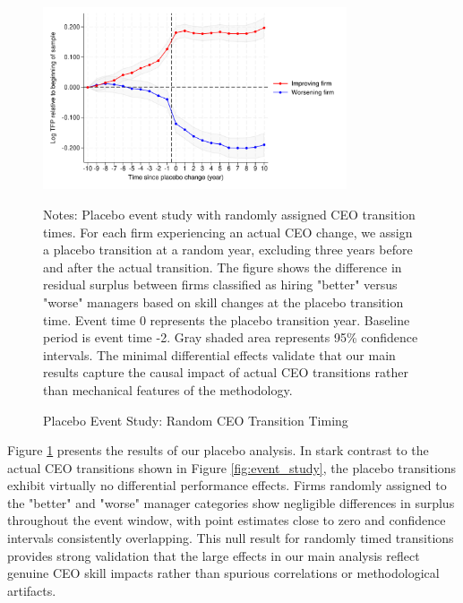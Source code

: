 \documentclass[11pt,a4paper]{article}
\begin{document}
\begin{figure}[htbp]
\centering
\includegraphics[width=0.8\textwidth]{figure/placebo.pdf}
\caption{Placebo Event Study: Random CEO Transition Timing}
\label{fig:placebo}
\footnotesize
Notes: Placebo event study with randomly assigned CEO transition times. For each firm experiencing an actual CEO change, we assign a placebo transition at a random year, excluding three years before and after the actual transition. The figure shows the difference in residual surplus between firms classified as hiring "better" versus "worse" managers based on skill changes at the placebo transition time. Event time 0 represents the placebo transition year. Baseline period is event time -2. Gray shaded area represents 95\% confidence intervals. The minimal differential effects validate that our main results capture the causal impact of actual CEO transitions rather than mechanical features of the methodology.
\end{figure}

Figure \ref{fig:placebo} presents the results of our placebo analysis. In stark contrast to the actual CEO transitions shown in Figure \ref{fig:event_study}, the placebo transitions exhibit virtually no differential performance effects. Firms randomly assigned to the "better" and "worse" manager categories show negligible differences in surplus throughout the event window, with point estimates close to zero and confidence intervals consistently overlapping. This null result for randomly timed transitions provides strong validation that the large effects in our main analysis reflect genuine CEO skill impacts rather than spurious correlations or methodological artifacts.




\end{document}
